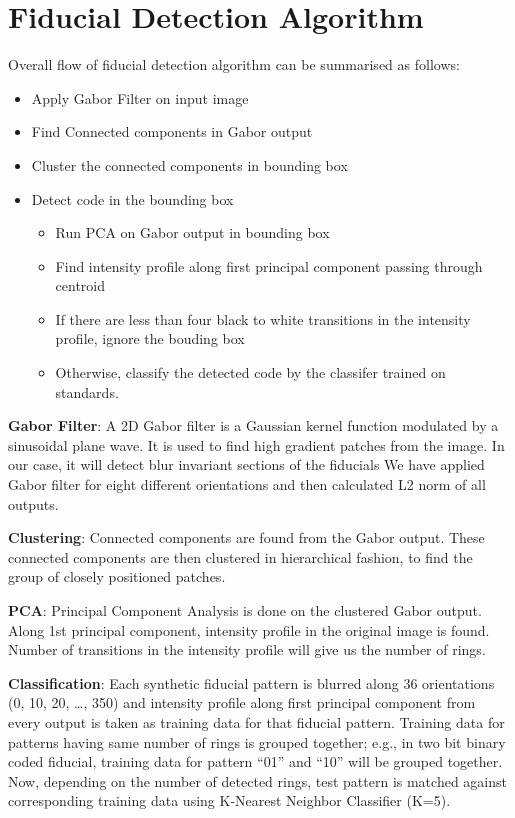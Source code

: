 \documentclass[runningheads]{llncs}
\begin{document}
\section{Fiducial Detection Algorithm}
Overall flow of fiducial detection algorithm can be summarised as follows:
\begin{itemize}
  \item Apply Gabor Filter on input image
  \item Find Connected components in Gabor output
  \item Cluster the connected components in bounding box
  \item Detect code in the bounding box
  \begin{itemize}
    \item Run PCA on Gabor output in bounding box
    \item Find intensity profile along first principal component passing through
    centroid
    \item If there are less than four black to white transitions in the
    intensity profile, ignore the bouding box
    \item Otherwise, classify the detected code by the classifer trained on
    standards.
  \end{itemize}
\end{itemize}

\textbf{Gabor Filter}: A 2D Gabor filter is a Gaussian kernel function modulated
by a sinusoidal plane wave\cite{GaborFilter}. It is used to find high gradient
patches from the image. In our case, it will detect blur invariant sections of the fiducials We
have applied Gabor filter for eight different orientations and then calculated
L2 norm of all outputs.

\textbf{Clustering}: Connected components are found from the Gabor output. 
These connected components are then clustered in hierarchical fashion, to find
the group of closely positioned patches.

\textbf{PCA}: Principal Component Analysis is done on the clustered Gabor
output. Along 1st principal component, intensity profile in the original image is found.
Number of transitions in the intensity profile will give us the number of rings.

\textbf{Classification}: Each synthetic fiducial pattern is blurred along 36
orientations (0, 10, 20, \ldots , 350) and intensity profile along first
principal component from every output is taken as training data for that fiducial pattern.
Training data for patterns having same number of rings is grouped together;
e.g., in two bit binary coded fiducial, training data for pattern “01” and “10”
will be grouped together. Now, depending on the number of detected rings, test
pattern is matched against corresponding training data using K-Nearest Neighbor
Classifier (K=5).
\end{document}
